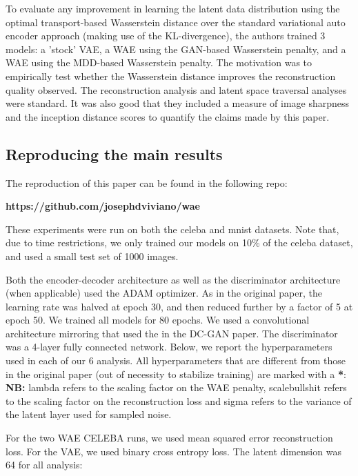 \documentclass[12pt,english]{amsart}
\begin{document}
To evaluate any improvement in learning the latent data distribution using
the optimal transport-based Wasserstein distance over the standard variational
auto encoder approach (making use of the KL-divergence), the authors trained 3
models: a 'stock' VAE, a WAE using the GAN-based Wasserstein penalty, and a WAE
using the MDD-based Wasserstein penalty. The motivation was to empirically test
whether the Wasserstein distance improves the reconstruction quality observed.
The reconstruction analysis and latent space traversal analyses were standard.
It was also good that they included a measure of image sharpness and the
inception distance scores to quantify the claims made by this paper.

\subsection{Reproducing the main results}

The reproduction of this paper can be found in the following repo:\\

\begin{center}
\textbf{https://github.com/josephdviviano/wae}
\end{center}

These experiments were run on both the celeba and mnist datasets. Note that,
due to time restrictions, we only trained our models on 10\% of the celeba
dataset, and used a small test set of 1000 images.

Both the encoder-decoder architecture as well as the discriminator architecture
(when applicable) used the ADAM optimizer. As in the original paper, the
learning rate was halved at epoch 30, and then reduced further by a factor of 5
at epoch 50. We trained all models for 80 epochs. We used a convolutional
architecture mirroring that used the in the DC-GAN paper. The discriminator was
a 4-layer fully connected network. Below, we report the  hyperparameters used in
each of our 6 analysis. All hyperparameters that are different from those in the
original paper (out of necessity to stabilize training) are marked with a
\textbf{*}:\\

\textbf{NB:} lambda refers to the scaling factor on the WAE penalty,
scalebullshit refers to the scaling factor on the reconstruction loss and sigma
refers to the variance of the latent layer used for sampled noise.

For the two WAE CELEBA runs, we used mean squared error reconstruction loss.
For the VAE, we used binary cross entropy loss. The latent dimension was 64
for all analysis: \\
\end{document}
